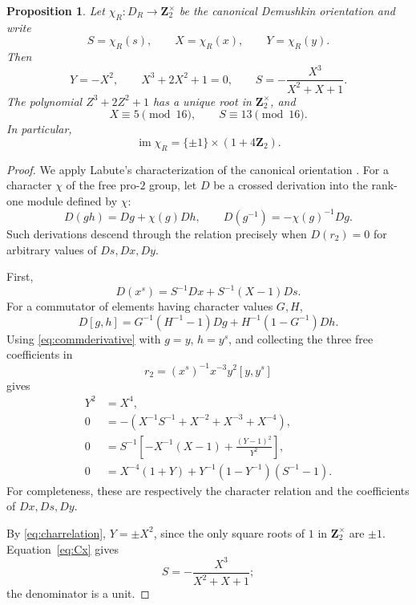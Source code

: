 \documentclass[11pt]{article}
\numberwithin{equation}{section}
\newtheorem{proposition}[theorem]{Proposition}
\theoremstyle{definition}
\theoremstyle{remark}
\newcommand{\Z}{\mathbf Z}
\newcommand{\im}{\operatorname{im}}
\newcommand{\DR}{D_R}
\newcommand{\chiR}{\chi_R}
\begin{document}
\begin{proposition}\label{prop:orientation}
Let \(\chiR:\DR\to\Z_2^\times\) be the canonical Demushkin orientation and
write
\[
  S=\chiR(s),\qquad X=\chiR(x),\qquad Y=\chiR(y).
\]
Then
\begin{equation}\label{eq:orientationvalues}
  Y=-X^2,\qquad
  X^3+2X^2+1=0,\qquad
  S=-\frac{X^3}{X^2+X+1}.
\end{equation}
The polynomial \(Z^3+2Z^2+1\) has a unique root in \(\Z_2^\times\), and
\[
  X\equiv5\pmod {16},\qquad S\equiv13\pmod {16}.
\]
In particular,
\[
  \im\chiR=\{\pm1\}\times(1+4\Z_2).
\]
\end{proposition}

\begin{proof}
We apply Labute's characterization of the canonical orientation
\cite[Theorem~4]{Labute}.  For a character \(\chi\) of the free pro-\(2\)
group, let \(D\) be a crossed derivation into the rank-one module defined by
\(\chi\):
\[
  D(gh)=Dg+\chi(g)Dh,\qquad
  D(g^{-1})=-\chi(g)^{-1}Dg.
\]
Such derivations descend through the relation precisely when \(D(r_2)=0\)
for arbitrary values of \(Ds,Dx,Dy\).

First,
\[
  D(x^s)=S^{-1}Dx+S^{-1}(X-1)Ds.
\]
For a commutator of elements having character values \(G,H\),
\begin{equation}\label{eq:commderivative}
  D[g,h]=G^{-1}(H^{-1}-1)Dg+
          H^{-1}(1-G^{-1})Dh.
\end{equation}
Using \cref{eq:commderivative} with \(g=y\), \(h=y^s\), and collecting the
three free coefficients in
\[
  r_2=(x^s)^{-1}x^{-3}y^2[y,y^s]
\]
gives
\begin{align}
  Y^2&=X^4, \label{eq:charrelation}\\
  0&=-(X^{-1}S^{-1}+X^{-2}+X^{-3}+X^{-4}),\label{eq:Cx}\\
  0&=S^{-1}\left[-X^{-1}(X-1)+
       \frac{(Y-1)^2}{Y^2}\right],\label{eq:Cs}\\
  0&=X^{-4}(1+Y)+
       Y^{-1}(1-Y^{-1})(S^{-1}-1).\label{eq:Cy}
\end{align}
For completeness, these are respectively the character relation and the
coefficients of \(Dx,Ds,Dy\).

By \cref{eq:charrelation}, \(Y=\pm X^2\), since the only square roots of
\(1\) in \(\Z_2^\times\) are \(\pm1\).  Equation~\eqref{eq:Cx} gives
\begin{equation}\label{eq:SfromX}
  S=-\frac{X^3}{X^2+X+1};
\end{equation}
the denominator is a unit.


\end{proof}
\end{document}
